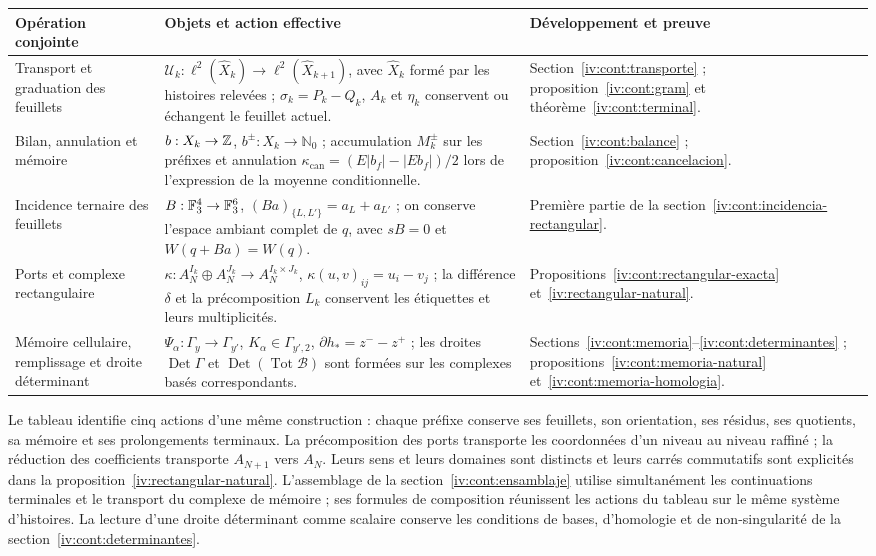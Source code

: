 \begin{center}
\small
\begin{tabular}{@{}p{.21\linewidth}p{.48\linewidth}p{.23\linewidth}@{}}
\toprule
Opération conjointe & Objets et action effective & Développement et preuve\\
\midrule
Transport et graduation des feuillets
& \(\mathcal U_k:\ell^2(\widehat X_k)\to
\ell^2(\widehat X_{k+1})\), avec \(\widehat X_k\) formé par les histoires relevées ; \(\sigma_k=P_k-Q_k\), \(A_k\) et \(\eta_k\) conservent ou échangent le feuillet actuel.
& Section~\ref{iv:cont:transporte} ; proposition~\ref{iv:cont:gram}
et théorème~\ref{iv:cont:terminal}.\\[5pt]
Bilan, annulation et mémoire
& \(b:X_k\to\mathbb Z\), \(b^\pm:X_k\to\mathbb N_0\) ;
accumulation \(M_k^\pm\) sur les préfixes et annulation
\(\kappa_{\mathrm{can}}=(E|b_f|-|Eb_f|)/2\) lors de l’expression de
la moyenne conditionnelle.
& Section~\ref{iv:cont:balance} ; proposition~\ref{iv:cont:cancelacion}.\\[5pt]
Incidence ternaire des feuillets
& \(B:\mathbb F_3^4\to\mathbb F_3^6\),
\((Ba)_{\{L,L'\}}=a_L+a_{L'}\) ; on conserve l’espace ambiant
complet de \(q\), avec \(sB=0\) et \(W(q+Ba)=W(q)\).
& Première partie de la section~\ref{iv:cont:incidencia-rectangular}.\\[5pt]
Ports et complexe rectangulaire
& \(\kappa:A_N^{I_k}\oplus A_N^{J_k}\to
A_N^{I_k\times J_k}\), \(\kappa(u,v)_{ij}=u_i-v_j\) ; la différence \(\delta\) et la précomposition \(L_k\) conservent les étiquettes et leurs multiplicités.
& Propositions~\ref{iv:cont:rectangular-exacta}
et~\ref{iv:rectangular-natural}.\\[5pt]
Mémoire cellulaire, remplissage et droite déterminant
& \(\Psi_\alpha:\Gamma_y\to\Gamma_{y'}\),
\(K_\alpha\in\Gamma_{y',2}\),
\(\partial h_*=z^--z^+\) ; les droites
\(\operatorname{Det}\Gamma\) et
\(\operatorname{Det}(\operatorname{Tot}\mathcal B)\)
sont formées sur les complexes basés correspondants.
& Sections~\ref{iv:cont:memoria}--\ref{iv:cont:determinantes} ;
propositions~\ref{iv:cont:memoria-natural}
et~\ref{iv:cont:memoria-homologia}.\\
\bottomrule
\end{tabular}
\end{center}

Le tableau identifie cinq actions d’une même construction : chaque
préfixe conserve ses feuillets, son orientation, ses résidus, ses quotients, sa mémoire
et ses prolongements terminaux. La précomposition des ports transporte les
coordonnées d’un niveau au niveau raffiné ; la réduction des coefficients
transporte \(A_{N+1}\) vers \(A_N\). Leurs sens et leurs domaines sont
distincts et leurs carrés commutatifs sont explicités dans la
proposition~\ref{iv:rectangular-natural}. L’assemblage de la
section~\ref{iv:cont:ensamblaje} utilise simultanément les
continuations terminales et le transport du complexe de mémoire ;
ses formules de composition réunissent les actions du tableau sur le
même système d’histoires. La lecture d’une droite déterminant
comme scalaire conserve les conditions de bases, d’homologie et de
non-singularité de la section~\ref{iv:cont:determinantes}.

